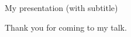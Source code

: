 
\let\header\big
\let\subheader\large

\newslide

\topfill
{\center %
    \header My presentation
    \subheader (with subtitle)
}

\newslide

\topfill
{\center
    Thank you for coming to my talk.
}

\bye
